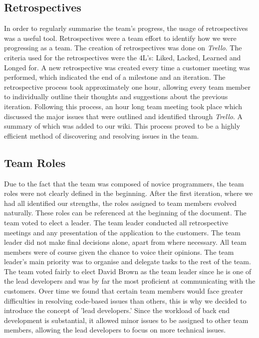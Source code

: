 \documentclass{l3proj}
\begin{document}
\subsection{Retrospectives}
\label{retrospective}

In order to regularly summarise the team's progress, the usage of retrospectives was a useful tool. Retrospectives were a team effort to identify how we were progressing as a team. The creation of retrospectives was done on \textit{Trello}. The criteria used for the retrospectives were the 4L's: Liked, Lacked, Learned and Longed for. A new retrospective was created every time a customer meeting was performed, which indicated the end of a milestone and an iteration. The retrospective process took approximately one hour, allowing every team member to individually outline their thoughts and suggestions about the previous iteration. Following this process, an hour long team meeting took place which discussed the major issues that were outlined and identified through \textit{Trello}. A summary of which was added to our wiki. This process proved to be a highly efficient method of discovering and resolving issues in the team.

\subsection{Team Roles}
\label{sec:roles}

Due to the fact that the team was composed of novice programmers, the team roles were not clearly defined in the beginning. After the first iteration, where we had all identified our strengths, the roles assigned to team members evolved naturally. These roles can be referenced at the beginning of the document. The team voted to elect a leader. The team leader conducted all retrospective meetings and any presentation of the application to the customers. The team leader did not make final decisions alone, apart from where necessary. All team members were of course given the chance to voice their opinions. The team leader's main priority was to organise and delegate tasks to the rest of the team. The team voted fairly to elect David Brown as the team leader since he is one of the lead developers and was by far the most proficient at communicating with the customers. Over time we found that certain team members would face greater difficulties in resolving code-based issues than others, this is why we decided to introduce the concept of 'lead developers.' Since the workload of back end development is substantial, it allowed minor issues to be assigned to other team members, allowing the lead developers to focus on more technical issues.
\end{document}
